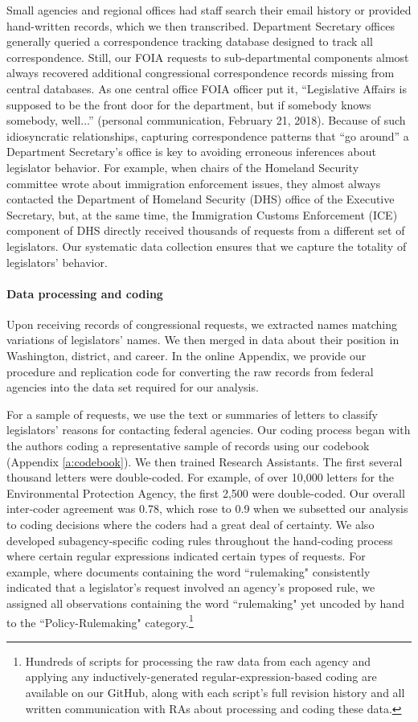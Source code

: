 \documentclass[12pt]{article}
\begin{document}
Small agencies and regional offices had staff search their email history or provided hand-written records, which we then transcribed. Department Secretary offices generally queried a correspondence tracking database designed to track all correspondence. Still, our FOIA requests to sub-departmental components almost always recovered additional congressional correspondence records missing from central databases. As one central office FOIA officer put it, ``Legislative Affairs is supposed to be the front door for the department, but if somebody knows somebody, well...'' (personal communication, February 21, 2018). Because of such idiosyncratic relationships, capturing correspondence patterns that ``go around'' a Department Secretary's office is key to avoiding erroneous inferences about legislator behavior. For example, when chairs of the Homeland Security committee wrote about immigration enforcement issues, they almost always contacted the Department of Homeland Security (DHS) office of the Executive Secretary, but, at the same time, the Immigration Customs Enforcement (ICE) component of DHS directly received thousands of requests from a different set of legislators. Our systematic data collection ensures that we capture the totality of legislators' behavior.

\paragraph{Data processing and coding} Upon receiving records of congressional requests, we extracted names matching variations of legislators' names. We then merged in data about their position in Washington, district, and career. In the online Appendix, we provide our procedure and replication code for converting the raw records from federal agencies into the data set required for our analysis. 

For a sample of requests, we use the text or summaries of letters to classify legislators' reasons for contacting federal agencies. Our coding process began with the authors coding a representative sample of records using our codebook (Appendix \ref{a:codebook}). We then trained Research Assistants. The first several thousand letters were double-coded. For example, of over 10,000 letters for the Environmental Protection Agency, the first 2,500 were double-coded. Our overall inter-coder agreement was 0.78, which rose to 0.9 when we subsetted our analysis to coding decisions where the coders had a great deal of certainty. We also developed subagency-specific coding rules throughout the hand-coding process where certain regular expressions indicated certain types of requests. For example, where documents containing the word ``rulemaking" consistently indicated that a legislator's request involved an agency's proposed rule, we assigned all observations containing the word ``rulemaking" yet uncoded by hand to the ``Policy-Rulemaking" category.\footnote{Hundreds of scripts for processing the raw data from each agency and applying any inductively-generated regular-expression-based coding are available on our GitHub, along with each script's full revision history and all written communication with RAs about processing and coding these data.}
\end{document}
